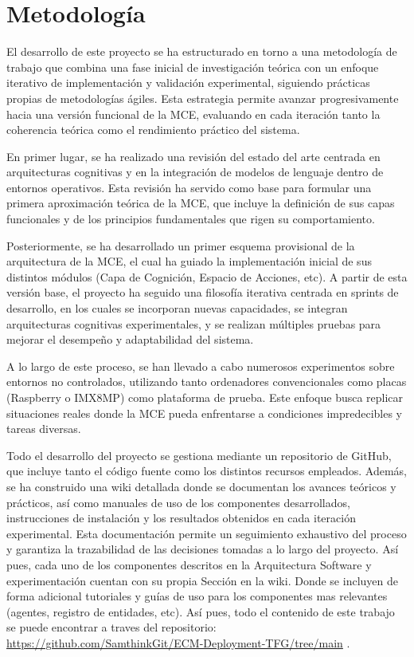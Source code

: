 \section{Metodología}
El desarrollo de este proyecto se ha estructurado en torno a una metodología de
trabajo que combina una fase inicial de investigación teórica con un enfoque
iterativo de implementación y validación experimental, siguiendo prácticas propias
de metodologías ágiles. Esta estrategia permite avanzar progresivamente
hacia una versión funcional de la MCE, evaluando en cada iteración tanto la
coherencia teórica como el rendimiento práctico del sistema.

En primer lugar, se ha realizado una revisión del estado del arte centrada en
arquitecturas cognitivas y en la integración de modelos de lenguaje 
dentro de entornos operativos. Esta revisión ha servido como base
para formular una primera aproximación teórica de la MCE, que incluye la
definición de sus capas funcionales y de los principios fundamentales que rigen
su comportamiento.

Posteriormente, se ha desarrollado un primer esquema provisional de la
arquitectura de la MCE, el cual ha guiado la implementación inicial de sus
distintos módulos (Capa de Cognición, Espacio de Acciones, etc). A
partir de esta versión base, el proyecto ha seguido una filosofía iterativa
centrada en sprints de desarrollo, en los cuales se incorporan nuevas
capacidades, se integran arquitecturas cognitivas experimentales, y se realizan
múltiples pruebas para mejorar el desempeño y adaptabilidad del sistema.

A lo largo de este proceso, se han llevado a cabo numerosos experimentos sobre
entornos no controlados, utilizando tanto ordenadores convencionales como placas (Raspberry o IMX8MP) 
como plataforma de prueba. Este enfoque busca replicar situaciones reales donde la MCE pueda
enfrentarse a condiciones impredecibles y tareas diversas.

Todo el desarrollo del proyecto se gestiona mediante un repositorio de GitHub,
que incluye tanto el código fuente como los distintos recursos empleados.
Además, se ha construido una wiki detallada donde se documentan los avances
teóricos y prácticos, así como manuales de uso de los componentes desarrollados,
instrucciones de instalación y los resultados obtenidos en cada iteración
experimental. Esta documentación permite un seguimiento exhaustivo del proceso y
garantiza la trazabilidad de las decisiones tomadas a lo largo del proyecto. Así
pues, cada uno de los componentes descritos en la Arquitectura Software y experimentación
cuentan con su propia Sección en la wiki. Donde se incluyen de forma adicional tutoriales y guías
de uso para los componentes mas relevantes (agentes, registro de entidades, etc).
Así pues, todo el contenido de este trabajo se puede encontrar a traves del 
repositorio: \url{https://github.com/SamthinkGit/ECM-Deployment-TFG/tree/main} .

